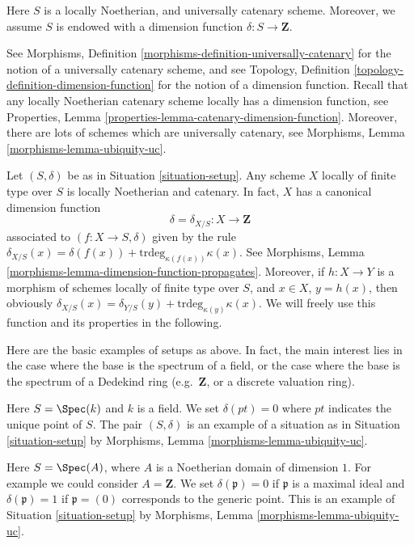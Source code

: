 \begin{situation}
\label{situation-setup}
Here $S$ is a locally Noetherian, and universally catenary scheme.
Moreover, we assume $S$ is endowed with a dimension function
$\delta : S \longrightarrow \mathbf{Z}$.
\end{situation}

\noindent
See Morphisms, Definition \ref{morphisms-definition-universally-catenary}
for the notion of a universally catenary scheme, and see
Topology, Definition \ref{topology-definition-dimension-function}
for the notion of a dimension function. Recall that any locally
Noetherian catenary scheme locally has a dimension function, see
Properties, Lemma \ref{properties-lemma-catenary-dimension-function}.
Moreover, there are lots of schemes which are universally catenary,
see Morphisms, Lemma \ref{morphisms-lemma-ubiquity-uc}.

\medskip\noindent
Let $(S, \delta)$ be as in Situation \ref{situation-setup}.
Any scheme $X$ locally of finite type over $S$ is locally Noetherian
and catenary. In fact, $X$ has a canonical dimension function
$$
\delta = \delta_{X/S} : X \longrightarrow \mathbf{Z}
$$
associated to $(f : X \to S, \delta)$ given by the rule
$\delta_{X/S}(x) = \delta(f(x)) + \text{trdeg}_{\kappa(f(x))}\kappa(x)$.
See Morphisms, Lemma \ref{morphisms-lemma-dimension-function-propagates}.
Moreover, if $h : X \to Y$ is a morphism of schemes locally of finite
type over $S$, and $x \in X$, $y = h(x)$,
then obviously
$\delta_{X/S}(x) = \delta_{Y/S}(y) + \text{trdeg}_{\kappa(y)}\kappa(x)$.
We will freely use this function and its properties in the following.

\medskip\noindent
Here are the basic examples of setups as above.
In fact, the main interest lies in the case where the base
is the spectrum of a field, or the case where the base
is the spectrum of a Dedekind ring (e.g.\ $\mathbf{Z}$,
or a discrete valuation ring).

\begin{example}
\label{example-field}
Here $S = \Spec(k)$ and $k$ is a field.
We set $\delta(pt) = 0$ where $pt$ indicates the unique point of $S$.
The pair $(S, \delta)$ is an example of a situation as in
Situation \ref{situation-setup} by
Morphisms, Lemma \ref{morphisms-lemma-ubiquity-uc}.
\end{example}

\begin{example}
\label{example-domain-dimension-1}
Here $S = \Spec(A)$, where $A$ is a Noetherian domain
of dimension $1$.
For example we could consider $A = \mathbf{Z}$.
We set $\delta(\mathfrak p) = 0$ if
$\mathfrak p$ is a maximal ideal and $\delta(\mathfrak p) = 1$
if $\mathfrak p = (0)$ corresponds to the generic point.
This is an example of Situation \ref{situation-setup} by
Morphisms, Lemma \ref{morphisms-lemma-ubiquity-uc}.
\end{example}

